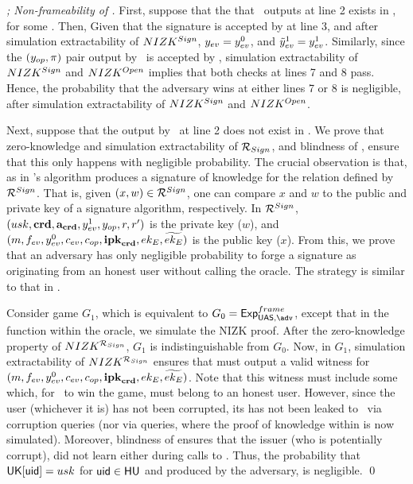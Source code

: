 \begin{proof}[; Non-frameability of \CUASGen]


  First, suppose that the \Sig that \adv~outputs at line 2 exists in
  \SIG, for some \uid. Then, Given that the signature is accepted by \Verify at
  line 3, and after simulation extractability of $NIZK^{Sign}$, $y_{ev} =
  y_{ev}^0$, and $\tilde{y}_{ev}^1 = y_{ev}^1$. Similarly, since the $(y_{op},\pi)$
  pair output by \adv~is accepted by \Judge, simulation extractability of
  $NIZK^{Sign}$ and $NIZK^{Open}$ implies that both checks at lines 7 and 8
  pass. Hence, the probability that the adversary wins at either lines 7 or 8 is
  negligible, after simulation extractability of $NIZK^{Sign}$ and
  $NIZK^{Open}$.

  Next, suppose that the \Sig output by \adv~at line 2 does not exist in \SIG.
  We prove that zero-knowledge and simulation extractability of
  $\mathcal{R}_{Sign}$, and blindness of \SBCM, ensure that this only happens with
  negligible probability.
  The crucial observation is that, as in \cite{cl06} \CUASGen's \Sign algorithm
  produces a signature of knowledge for the relation defined by
  $\mathcal{R}^{Sign}$. That is, given $(x,w) \in \mathcal{R}^{Sign}$, one can
  compare $x$ and $w$ to the public and private key of a signature algorithm,
  respectively. In $\mathcal{R}^{Sign}$, $(usk,\mathbf{crd},\mathbf{a}_{\mathbf{crd}},y_{ev}^1,
  y_{op},r,r')$ is the private key ($w$), and $(m,f_{ev},y_{ev}^0,c_{ev},
  c_{op},\mathbf{ipk}_{\mathbf{crd}},ek_{E},\widetilde{ek_{E}})$ is the public key ($x$).
  From this, we prove that an adversary has only negligible probability to forge
  a signature as originating from an honest user without calling the \SIGN
  oracle. The strategy is similar to that in \cite[Theorem 2.1]{cl06}.

  Consider game $G_1$, which is equivalent to $G_0 = \ExpNonframe$, except that
  in the \Sign function within the \SIGN oracle, we simulate the NIZK proof.
  After the zero-knowledge property of $NIZK^{\mathcal{R}_{Sign}}$, $G_1$ is
  indistinguishable from $G_0$. Now, in $G_1$, simulation extractability of
  $NIZK^{\mathcal{R}_{Sign}}$ ensures that \ExtractSign must output a valid
  witness for $(m,f_{ev},y_{ev}^0,c_{ev},c_{op},\mathbf{ipk}_{\mathbf{crd}},ek_{E},
  \widetilde{ek_{E}})$. Note that this witness must include some \usk which,
  for \adv~to win the game, must belong to an honest user. However, since the
  user (whichever it is) has not been corrupted, its \usk has not been leaked
  to \adv~via corruption queries (nor via \SIGN queries, where the proof of
  knowledge within \Sign is now simulated). Moreover, blindness of \SBCM ensures
  that the issuer (who is potentially corrupt), did not learn \usk either during
  calls to \OBTAIN. Thus, the probability that $\mathsf{UK}[\mathsf{uid}] = usk$ for $\mathsf{uid} \in
  \mathsf{HU}$ and \Sig produced by the adversary, is negligible.
  \qed
\end{proof}


